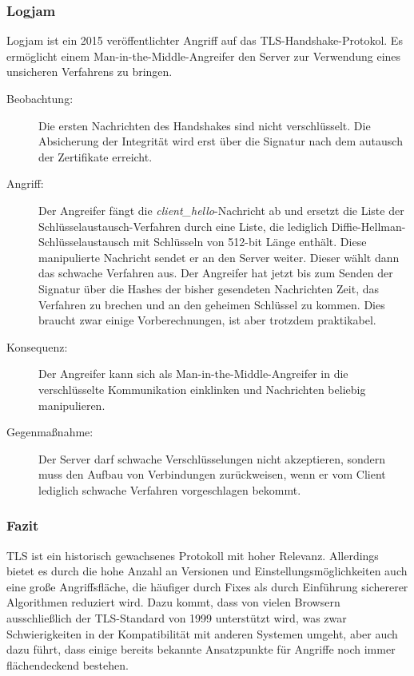 \subsubsection{Logjam}
Logjam\cite{Adrian2015} ist ein 2015 veröffentlichter Angriff auf das
TLS-Handshake-Protokol. Es ermöglicht einem Man-in-the-Middle-Angreifer
den Server zur Verwendung eines unsicheren Verfahrens zu bringen.
\begin{description}
\item[Beobachtung:] 
  Die ersten Nachrichten des Handshakes sind nicht verschlüsselt. Die
  Absicherung der Integrität wird erst über die Signatur nach dem
  autausch der Zertifikate erreicht.
\item[Angriff:] Der Angreifer fängt die \emph{client\_hello}-Nachricht ab
  und ersetzt die Liste der Schlüsselaustausch-Verfahren durch eine
  Liste, die lediglich Diffie-Hellman-Schlüsselaustausch mit Schlüsseln
  von 512-bit Länge enthält. Diese manipulierte Nachricht sendet er an
  den Server weiter. Dieser wählt dann das schwache Verfahren aus.
  Der Angreifer hat jetzt bis zum Senden der Signatur über die Hashes
  der bisher gesendeten Nachrichten Zeit, das Verfahren zu brechen und
  an den geheimen Schlüssel zu kommen. Dies braucht zwar einige
  Vorberechnungen, ist aber trotzdem praktikabel.
\item[Konsequenz:] Der Angreifer kann sich als
  Man-in-the-Middle-Angreifer in die verschlüsselte Kommunikation
  einklinken und Nachrichten beliebig manipulieren.
\item[Gegenmaßnahme:] Der Server darf schwache Verschlüsselungen nicht
  akzeptieren, sondern muss den Aufbau von Verbindungen zurückweisen,
  wenn er vom Client lediglich schwache Verfahren vorgeschlagen bekommt.
\end{description}

\subsubsection{Fazit}
TLS \indexTLS ist ein historisch gewachsenes Protokoll mit hoher
Relevanz. Allerdings bietet es durch die hohe Anzahl an Versionen und
Einstellungsmöglichkeiten auch eine große Angriffsfläche, die häufiger
durch Fixes als durch Einführung sichererer Algorithmen reduziert
wird. Dazu kommt, dass von vielen Browsern ausschließlich der
TLS-Standard von 1999 unterstützt wird, was zwar Schwierigkeiten in der
Kompatibilität mit anderen Systemen umgeht, aber auch dazu führt, dass
einige bereits bekannte Ansatzpunkte für Angriffe noch immer
flächendeckend bestehen.

